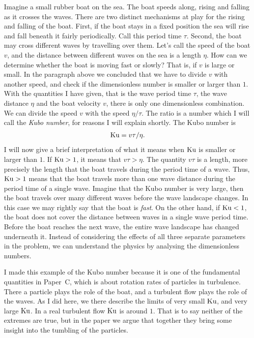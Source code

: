 \documentclass[thesis.tex]{subfiles}
\begin{document}
Imagine a small rubber boat on the sea. The boat speeds along, rising and falling as it crosses the waves. There are two distinct mechanisms at play for the rising and falling of the boat. First, if the boat stays in a fixed position the sea will rise and fall beneath it fairly periodically. Call this period time $\tau$. Second, the boat may cross different waves by travelling over them. Let's call the speed of the boat $v$, and the distance between different waves on the sea is a length $\eta$. How can we determine whether the boat is moving fast or slowly? That is, if $v$ is large or small. In the paragraph above we concluded that we have to divide $v$ with another speed, and check if the dimensionless number is smaller or larger than $1$. With the quantities I have given, that is the wave period time $\tau$, the wave distance $\eta$ and the boat velocity $v$, there is only one dimensionless combination. We can divide the speed $v$ with the speed $\eta/\tau$. The ratio is a number which I will call the \emph{Kubo number}, for reasons I will explain shortly. The Kubo number is
\begin{align*}
\mbox{Ku} = v\tau/\eta.
\end{align*}
I will now give a brief interpretation of what it means when $\mbox{Ku}$ is smaller or larger than $1$. If $\mbox{Ku} > 1$, it means that $v\tau > \eta$. The quantity $v\tau$ is a length, more precisely the length that the boat travels during the period time of a wave. Thus, $\mbox{Ku} > 1$ means that the boat travels more than one wave distance during the period time of a single wave. Imagine that the Kubo number is very large, then the boat travels over many different waves before the wave landscape changes. In this case we may rightly say that the boat is \emph{fast}. On the other hand, if $\mbox{Ku}<1$, the boat does not cover the distance between waves in a single wave period time. Before the boat reaches the next wave, the entire wave landscape has changed underneath it. Instead of considering the effects of all three separate parameters in the problem, we can understand the physics by analysing the dimensionless numbers.

I made this example of the Kubo number because it is one of the fundamental quantities in Paper~C, which is about rotation rates of particles in turbulence. There a particle plays the role of the boat, and a turbulent flow plays the role of the waves. As I did here, we there describe the limits of very small $\mbox{Ku}$, and very large $\mbox{Ku}$. In a real turbulent flow $\mbox{Ku}$ is around $1$. That is to say neither of the extremes are true, but in the paper we argue that together they bring some insight into the tumbling of the particles.
\end{document}
